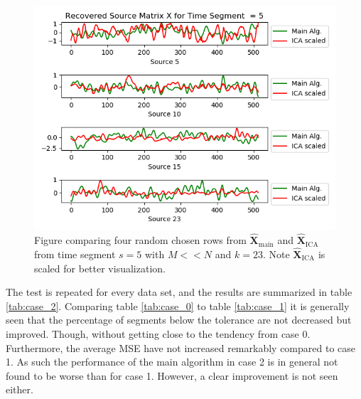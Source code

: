 \begin{figure}[H]
\begin{widepage}
\begin{minipage}[t]{.49\textwidth}
\includegraphics[width=1\linewidth]{figures/ch_7/resultat/EEG_second_removed_scaled_timeseg5S1_CClean.png}
\caption{Figure comparing four random chosen rows from $\hat{\mathbf{X}}_{\text{main}}$ and $\hat{\mathbf{X}}_{\text{ICA}}$ from time segment $s = 5$ with $M << N$ and $k=23$. Note $\hat{\mathbf{X}}_{\text{ICA}}$ is scaled for better visualization.}
	\label{fig:M<<N_3}
    \end{minipage}
\end{widepage}
\end{figure}
\noindent
The test is repeated for every data set, and the results are summarized in table \ref{tab:case_2}. Comparing table \ref{tab:case_0} to table \ref{tab:case_1} it is generally seen that the percentage of segments below the tolerance are not decreased but improved.
Though, without getting close to the tendency from case 0. 
Furthermore, the average MSE have not increased remarkably compared to case 1. 
As such the performance of the main algorithm in case 2 is in general not found to be worse than for case 1.
However, a clear improvement is not seen either.  
